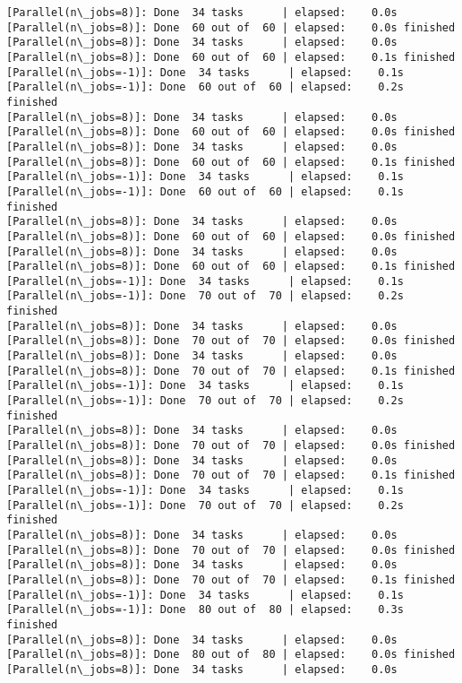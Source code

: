\documentclass[11pt]{article}
\begin{document}
\begin{Verbatim}[commandchars=\\\{\}]
[Parallel(n\_jobs=8)]: Done  34 tasks      | elapsed:    0.0s
[Parallel(n\_jobs=8)]: Done  60 out of  60 | elapsed:    0.0s finished
[Parallel(n\_jobs=8)]: Done  34 tasks      | elapsed:    0.0s
[Parallel(n\_jobs=8)]: Done  60 out of  60 | elapsed:    0.1s finished
[Parallel(n\_jobs=-1)]: Done  34 tasks      | elapsed:    0.1s
[Parallel(n\_jobs=-1)]: Done  60 out of  60 | elapsed:    0.2s finished
[Parallel(n\_jobs=8)]: Done  34 tasks      | elapsed:    0.0s
[Parallel(n\_jobs=8)]: Done  60 out of  60 | elapsed:    0.0s finished
[Parallel(n\_jobs=8)]: Done  34 tasks      | elapsed:    0.0s
[Parallel(n\_jobs=8)]: Done  60 out of  60 | elapsed:    0.1s finished
[Parallel(n\_jobs=-1)]: Done  34 tasks      | elapsed:    0.1s
[Parallel(n\_jobs=-1)]: Done  60 out of  60 | elapsed:    0.1s finished
[Parallel(n\_jobs=8)]: Done  34 tasks      | elapsed:    0.0s
[Parallel(n\_jobs=8)]: Done  60 out of  60 | elapsed:    0.0s finished
[Parallel(n\_jobs=8)]: Done  34 tasks      | elapsed:    0.0s
[Parallel(n\_jobs=8)]: Done  60 out of  60 | elapsed:    0.1s finished
[Parallel(n\_jobs=-1)]: Done  34 tasks      | elapsed:    0.1s
[Parallel(n\_jobs=-1)]: Done  70 out of  70 | elapsed:    0.2s finished
[Parallel(n\_jobs=8)]: Done  34 tasks      | elapsed:    0.0s
[Parallel(n\_jobs=8)]: Done  70 out of  70 | elapsed:    0.0s finished
[Parallel(n\_jobs=8)]: Done  34 tasks      | elapsed:    0.0s
[Parallel(n\_jobs=8)]: Done  70 out of  70 | elapsed:    0.1s finished
[Parallel(n\_jobs=-1)]: Done  34 tasks      | elapsed:    0.1s
[Parallel(n\_jobs=-1)]: Done  70 out of  70 | elapsed:    0.2s finished
[Parallel(n\_jobs=8)]: Done  34 tasks      | elapsed:    0.0s
[Parallel(n\_jobs=8)]: Done  70 out of  70 | elapsed:    0.0s finished
[Parallel(n\_jobs=8)]: Done  34 tasks      | elapsed:    0.0s
[Parallel(n\_jobs=8)]: Done  70 out of  70 | elapsed:    0.1s finished
[Parallel(n\_jobs=-1)]: Done  34 tasks      | elapsed:    0.1s
[Parallel(n\_jobs=-1)]: Done  70 out of  70 | elapsed:    0.2s finished
[Parallel(n\_jobs=8)]: Done  34 tasks      | elapsed:    0.0s
[Parallel(n\_jobs=8)]: Done  70 out of  70 | elapsed:    0.0s finished
[Parallel(n\_jobs=8)]: Done  34 tasks      | elapsed:    0.0s
[Parallel(n\_jobs=8)]: Done  70 out of  70 | elapsed:    0.1s finished
[Parallel(n\_jobs=-1)]: Done  34 tasks      | elapsed:    0.1s
[Parallel(n\_jobs=-1)]: Done  80 out of  80 | elapsed:    0.3s finished
[Parallel(n\_jobs=8)]: Done  34 tasks      | elapsed:    0.0s
[Parallel(n\_jobs=8)]: Done  80 out of  80 | elapsed:    0.0s finished
[Parallel(n\_jobs=8)]: Done  34 tasks      | elapsed:    0.0s

\end{Verbatim}
\end{document}
